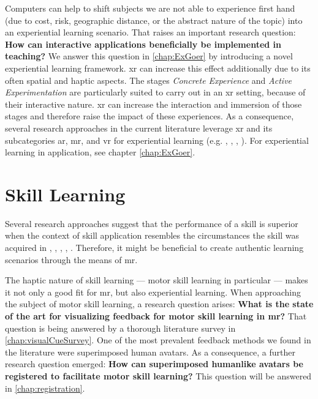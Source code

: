 Computers can help to shift subjects we are not able to experience first hand (due to cost, risk, geographic distance, or the abstract nature of the topic) into an experiential learning scenario. That raises an important research question: \textbf{How can interactive applications beneficially be implemented in teaching?} We answer this question in \autoref{chap:ExGoer} by introducing a novel experiential learning framework. \Acrshort{xr} can increase this effect additionally due to its often spatial and haptic aspects.
The stages \emph{Concrete Experience} and \emph{Active Experimentation} are particularly suited to carry out in an \acrshort{xr} setting, because of their interactive nature. \acrshort{xr} can increase the interaction and immersion of those stages and therefore raise the impact of these experiences.
As a consequence, several research approaches in the current literature leverage \acrshort{xr} and its subcategories \acrshort{ar}, \acrshort{mr}, and \acrshort{vr} for experiential learning (e.g. \cite{asad2021virtual}, \cite{majgaard2020virtual}, \cite{wang2007experiential}, \cite{pueschel:2013:MRCG}). For experiential learning in application, see chapter \autoref{chap:ExGoer}.

\section{Skill Learning \label{sec:skill}}
Several research approaches suggest that the performance of a skill is superior when the context of skill application resembles the circumstances the skill was acquired in \cite{godden1975context}, \cite{ruitenberg2012context}, \cite{smith2001environmental}, \cite{anderson1998contextual}, \cite{wright1991contextual}. Therefore, it might be beneficial to create authentic learning scenarios through the means of \acrshort{mr}.

The haptic nature of skill learning --- motor skill learning in particular --- makes it not only a good fit for \acrshort{mr}, but also experiential learning. When approaching the subject of motor skill learning, a research question arises: \textbf{What is the state of the art for visualizing feedback for motor skill learning in \acrlong{mr}?} That question is being answered by a thorough literature survey in \autoref{chap:visualCueSurvey}. One of the most prevalent feedback methods we found in the literature were superimposed human avatars. As a consequence, a further research question emerged: \textbf{How can superimposed humanlike avatars be registered to facilitate motor skill learning?} This question will be answered in \autoref{chap:registration}.

